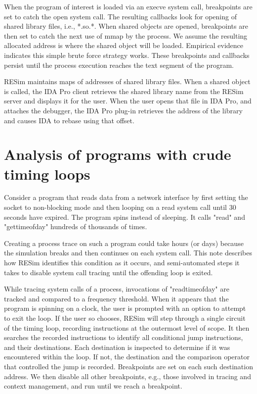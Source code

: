 \documentclass[titlepage]{article}
\begin{document}
When the program of interest is loaded via an execve system call, breakpoints are set to catch the open system call.  The resulting callbacks look for opening of shared library files, i.e., *.so.*.   When shared objects are opened, breakpoints are then set to catch the next use of mmap by the process.  We assume the resulting allocated address is where the shared object will be loaded.  Empirical evidence indicates this simple brute force strategy works.  These breakpoints and callbacks persist until the process execution reaches the text segment of the program.

RESim maintains maps of addresses of shared library files.   When a shared object is called, the IDA Pro client retrieves the shared library name from the RESim server and displays it for the user.  When the user opens that file in IDA Pro, and attaches the debugger, the IDA Pro plug-in retrieves the address of the library and causes IDA to rebase using that offset.

\section{Analysis of programs with crude timing loops}

Consider a program that reads data from a network interface by first setting the socket to non-blocking mode and then looping on a read system call until 30 seconds have expired.  The program spins instead of sleeping.  It calls "read" and "gettimeofday" hundreds of thousands of times.

Creating a process trace on such a program could take hours (or days) because the simulation breaks and then continues on each system call.  This note describes how RESim identifies this condition as it occurs, and semi-automated steps it takes to disable system call tracing until the offending loop is exited.  

While tracing system calls of a process, invocations of "readtimeofday" are tracked and compared to a frequency threshold.  When it appears that the program is spinning on a clock, the user is prompted with an option to attempt to exit the loop. If the user so chooses, RESim will step through a single circuit of the timing loop, recording instructions at the outermost level of scope. It then searches the recorded instructions to identify all conditional jump instructions, and their destinations. Each destination is inspected to determine if it was encountered within the loop.  If not, the destination and the comparison operator that controlled the jump is recorded.  Breakpoints are set on each such destination address.  We then disable all other breakpoints, e.g., those involved in tracing and context management, and run until we reach a breakpoint.  
\end{document}
